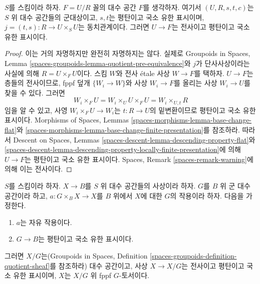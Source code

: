 \begin{lemma}
\label{lemma-covering-quotient}
$S$를 스킴이라 하자. $F = U/R$ 꼴의 대수 공간 $F$를 생각하자.
여기서 $(U, R, s, t, c)$는 $S$ 위 대수 공간들의 군대상이고,
$s, t$는 평탄이고 국소 유한 표시이며,
$j = (t, s) : R \to U \times_S U$는 동치관계이다.
그러면 $U \to F$는 전사이고 평탄이고 국소 유한 표시이다.
\end{lemma}

\begin{proof}
이는 거의 자명하지만 완전히 자명하지는 않다.
실제로 Groupoids in Spaces, Lemma
\ref{spaces-groupoids-lemma-quotient-pre-equivalence}와
$j$가 단사사상이라는 사실에 의해 $R = U \times_F U$이다.
스킴 $W$와 전사 \'etale 사상 $W \to F$를 택하자.
$U \to F$는 층들의 전사이므로, fppf 덮개
$\{W_i \to W\}$와 사상 $W_i \to F$를 올리는 사상 $W_i \to U$를
찾을 수 있다. 그러면
$$
W_i \times_F U = W_i \times_U U \times_F U = W_i \times_{U, t} R
$$
임을 알 수 있고, 사영 $W_i \times_F U \to W_i$는
$t : R \to U$의 밑변환이므로 평탄이고 국소 유한 표시이다.
Morphisms of Spaces, Lemmas
\ref{spaces-morphisms-lemma-base-change-flat}와
\ref{spaces-morphisms-lemma-base-change-finite-presentation}를 참조하라.
따라서 Descent on Spaces, Lemmas
\ref{spaces-descent-lemma-descending-property-flat}와
\ref{spaces-descent-lemma-descending-property-locally-finite-presentation}에
의해 $U \to F$는 평탄이고 국소 유한 표시이다.
Spaces, Remark \ref{spaces-remark-warning}에 의해 이는 전사이다.
\end{proof}

\begin{lemma}
\label{lemma-quotient-free-action}
$S$를 스킴이라 하자. $X \to B$를 $S$ 위 대수 공간들의 사상이라 하자.
$G$를 $B$ 위 군 대수 공간이라 하고,
$a : G \times_B X \to X$를 $B$ 위에서 $X$에 대한 $G$의 작용이라 하자.
다음을 가정한다.
\begin{enumerate}
\item $a$는 자유 작용이다.
\item $G \to B$는 평탄이고 국소 유한 표시이다.
\end{enumerate}
그러면 $X/G$는(Groupoids in Spaces, Definition
\ref{spaces-groupoids-definition-quotient-sheaf}를 참조하라)
대수 공간이고, 사상 $X \to X/G$는 전사이고 평탄이고
국소 유한 표시이며, $X$는 $X/G$ 위 fppf $G$-토서이다.
\end{lemma}

